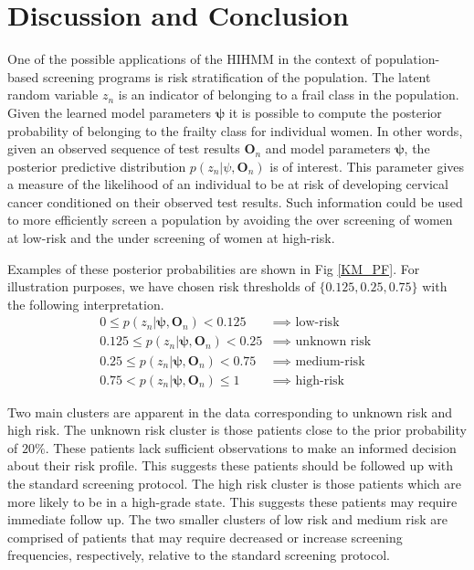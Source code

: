 \documentclass{article}
\begin{document}
\section{Discussion and Conclusion}
One of the possible applications of the HIHMM in the context of population-based screening programs is risk stratification of the population.  The latent random variable $z_n$ is an indicator of belonging to a frail class in the population.  Given the learned model parameters $\bm \psi$  it is possible to compute the posterior probability of belonging to the frailty class for individual women.  In other words, given an observed sequence of test results ${\bm O}_n$ and model parameters  $\bm \psi$,  the posterior predictive distribution $p(z_n | \psi, {\bm O}_n)$ is of interest.  This parameter gives a measure of the likelihood of an individual to be at risk of developing cervical cancer conditioned on their observed test results. Such information could be used to more efficiently screen a population by avoiding the over screening of women at low-risk and the under screening of women at high-risk.  


Examples of these posterior probabilities are shown in Fig \ref{KM_PF}. For illustration purposes, we have chosen risk thresholds of $\{0.125,0.25, 0.75\}$ with the following interpretation.
\begin{align*}
0 \leq p(z_n | \bm \psi, {\bm O}_n) < 0.125 &\implies \text{ low-risk  } \\
0.125 \leq p(z_n | \bm \psi, {\bm O}_n)  < 0.25 &\implies \text{ unknown risk  }\\
0.25 \leq p(z_n | \bm \psi, {\bm O}_n)  < 0.75      &\implies \text{ medium-risk }\\
0.75 <  p(z_n | \bm \psi, {\bm O}_n) \leq 1 &\implies \text{ high-risk } 
\end{align*}

Two main clusters are apparent in the data corresponding to unknown risk and high risk. The unknown risk cluster is those patients close to the prior probability of $20\%$.  These patients lack sufficient observations to make an informed decision about their risk profile.  This suggests these patients should be followed up with the standard screening protocol.  The high risk cluster is those patients which are more likely to be in a high-grade state.  This suggests these patients may require immediate follow up.  The two smaller clusters of low risk and medium risk are comprised of patients that may require decreased or increase screening frequencies, respectively, relative to the standard screening protocol. 
\end{document}
